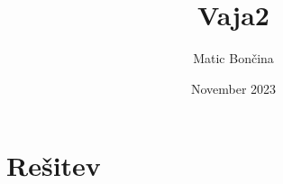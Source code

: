 \documentclass{article}
\title{Vaja2}
\author{Matic Bončina}
\date{November 2023}
\begin{document}
\maketitle

\newpage
\section{Rešitev}

\cite{ray2023chatgpt}
\cite{WinNT}



\end{document}
